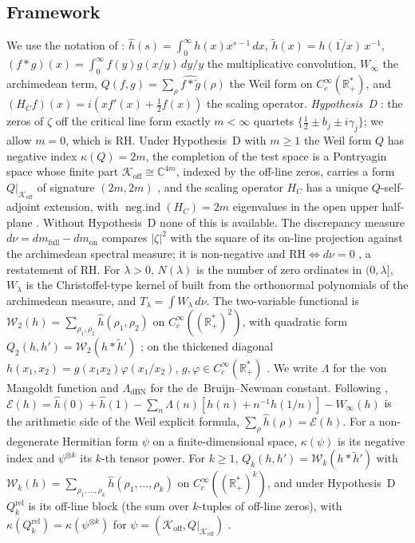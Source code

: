 \documentclass[11pt]{amsart}
\theoremstyle{definition}
\theoremstyle{remark}
\newcommand{\RH}{\mathrm{RH}}
\newcommand{\bbR}{\mathbb{R}}
\newcommand{\bbC}{\mathbb{C}}
\newcommand{\Koff}{\mathcal{K}_{\mathrm{off}}}
\newcommand{\negind}{\operatorname{neg.ind}}
\newcommand{\Wtwo}{\mathcal{W}_2}
\newcommand{\dnu}{d\nu}
\newcommand{\Tl}{T_\lambda}
\newcommand{\La}{\Lambda}
\newcommand{\LDBN}{\Lambda_{\mathrm{dBN}}}
\begin{document}
\subsection{Framework}
We use the notation of \cite[\S1.3]{P28}: $\hat h(s)=\int_0^\infty
h(x)x^{s-1}\,dx$, $\tilde h(x)=\overline{h(1/x)}\,x^{-1}$,
$(f*g)(x)=\int_0^\infty f(y)g(x/y)\,dy/y$ the multiplicative convolution,
$W_\infty$ the archimedean term, $Q(f,g)=\sum_\rho\widehat{f*\tilde g}(\rho)$
the Weil form on $C_c^\infty(\bbR_+^*)$, and $(H_Cf)(x)=i(xf'(x)+\tfrac12f(x))$
the scaling operator.
\emph{Hypothesis~D} \cite[Def.~2.4]{P25}: the zeros of $\zeta$ off the
critical line form exactly $m<\infty$ quartets
$\{\tfrac12\pm b_j\pm i\gamma_j\}$; we allow $m=0$, which is RH. Under
Hypothesis~D with $m\ge1$ the Weil form $Q$ has negative index $\kappa(Q)=2m$,
the completion of the test space is a Pontryagin space whose finite part
$\Koff\cong\bbC^{4m}$, indexed by the off-line zeros, carries a form
$Q|_{\Koff}$ of signature $(2m,2m)$ \cite[Prop.~4.7]{P25}, and the scaling
operator $H_C$ has a unique $Q$-self-adjoint extension, with
$\negind(H_C)=2m$ eigenvalues in the open upper half-plane \cite[Prop.~5.3]{P25}. Without Hypothesis~D none of this is
available. The discrepancy measure $\dnu=d m_{\mathrm{full}}-d m_{\mathrm{on}}$
compares $|\zeta|^2$ with the square of its on-line projection against the
archimedean spectral measure; it is non-negative and $\RH\iff\dnu=0$
\cite[Def.~2.1, Cor.~3.2]{P24}, a restatement of RH. For $\lambda>0$,
$N(\lambda)$ is the number of zero ordinates in $(0,\lambda]$, $W_\lambda$ is
the Christoffel-type kernel of \cite[(2)]{P27} built from the orthonormal
polynomials of the archimedean measure, and $\Tl=\int W_\lambda\,\dnu$. The
two-variable functional is
$\Wtwo(h)=\sum_{\rho_1,\rho_2}\hat h(\rho_1,\rho_2)$ on
$C_c^\infty((\bbR_+^*)^2)$, with quadratic form
$Q_2(h,h')=\Wtwo(h*\tilde h')$ \cite[\S5]{P28}; on the thickened diagonal
$h(x_1,x_2)=g(x_1x_2)\varphi(x_1/x_2)$, $g,\varphi\in C_c^\infty(\bbR_+^*)$
\cite[(1)]{P28}. We write $\La$ for the von Mangoldt function and $\LDBN$
for the de~Bruijn--Newman constant. Following \cite[\S1.3]{P28},
$\mathcal E(h)=\hat h(0)+\hat h(1)-\sum_n\La(n)[h(n)+n^{-1}h(1/n)]-W_\infty(h)$
is the arithmetic side of the Weil explicit formula,
$\sum_\rho\hat h(\rho)=\mathcal E(h)$. For a non-degenerate Hermitian form
$\psi$ on a finite-dimensional space, $\kappa(\psi)$ is its negative index and
$\psi^{\otimes k}$ its $k$-th tensor power. For $k\ge1$,
$Q_k(h,h')=\mathcal W_k(h*\tilde h')$ with
$\mathcal W_k(h)=\sum_{\rho_1,\dots,\rho_k}\hat h(\rho_1,\dots,\rho_k)$ on
$C_c^\infty((\bbR_+^*)^k)$, and under Hypothesis~D $Q_k^{\mathrm{rel}}$ is its
off-line block (the sum over $k$-tuples of off-line zeros), with
$\kappa(Q_k^{\mathrm{rel}})=\kappa(\psi^{\otimes k})$ for
$\psi=(\Koff,Q|_{\Koff})$ \cite[\S6.1]{P28}.
\end{document}
